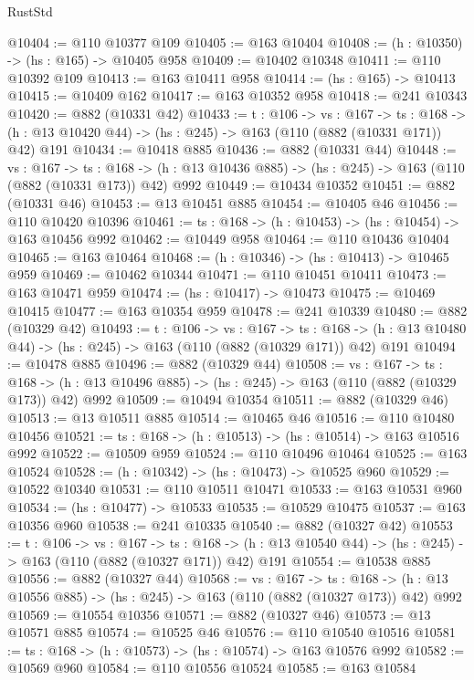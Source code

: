 \begin{lexlean}{RustStd}
\begin{coremodule}
@10404 := @110 @10377 @109
@10405 := @163 @10404
@10408 := (h : @10350) -> (hs : @165) -> @10405 @958
@10409 := @10402 @10348
@10411 := @110 @10392 @109
@10413 := @163 @10411 @958
@10414 := (hs : @165) -> @10413
@10415 := @10409 @162
@10417 := @163 @10352 @958
@10418 := @241 @10343
@10420 := @882 (@10331 @42)
@10433 := {t : @106} ->
  {vs : @167} ->
  {ts : @168} -> (h : @13 @10420 @44) -> (hs : @245) -> @163 (@110 (@882 (@10331 @171)) @42) @191
@10434 := @10418 @885
@10436 := @882 (@10331 @44)
@10448 := {vs : @167} ->
  {ts : @168} -> (h : @13 @10436 @885) -> (hs : @245) -> @163 (@110 (@882 (@10331 @173)) @42) @992
@10449 := @10434 @10352
@10451 := @882 (@10331 @46)
@10453 := @13 @10451 @885
@10454 := @10405 @46
@10456 := @110 @10420 @10396
@10461 := {ts : @168} -> (h : @10453) -> (hs : @10454) -> @163 @10456 @992
@10462 := @10449 @958
@10464 := @110 @10436 @10404
@10465 := @163 @10464
@10468 := (h : @10346) -> (hs : @10413) -> @10465 @959
@10469 := @10462 @10344
@10471 := @110 @10451 @10411
@10473 := @163 @10471 @959
@10474 := (hs : @10417) -> @10473
@10475 := @10469 @10415
@10477 := @163 @10354 @959
@10478 := @241 @10339
@10480 := @882 (@10329 @42)
@10493 := {t : @106} ->
  {vs : @167} ->
  {ts : @168} -> (h : @13 @10480 @44) -> (hs : @245) -> @163 (@110 (@882 (@10329 @171)) @42) @191
@10494 := @10478 @885
@10496 := @882 (@10329 @44)
@10508 := {vs : @167} ->
  {ts : @168} -> (h : @13 @10496 @885) -> (hs : @245) -> @163 (@110 (@882 (@10329 @173)) @42) @992
@10509 := @10494 @10354
@10511 := @882 (@10329 @46)
@10513 := @13 @10511 @885
@10514 := @10465 @46
@10516 := @110 @10480 @10456
@10521 := {ts : @168} -> (h : @10513) -> (hs : @10514) -> @163 @10516 @992
@10522 := @10509 @959
@10524 := @110 @10496 @10464
@10525 := @163 @10524
@10528 := (h : @10342) -> (hs : @10473) -> @10525 @960
@10529 := @10522 @10340
@10531 := @110 @10511 @10471
@10533 := @163 @10531 @960
@10534 := (hs : @10477) -> @10533
@10535 := @10529 @10475
@10537 := @163 @10356 @960
@10538 := @241 @10335
@10540 := @882 (@10327 @42)
@10553 := {t : @106} ->
  {vs : @167} ->
  {ts : @168} -> (h : @13 @10540 @44) -> (hs : @245) -> @163 (@110 (@882 (@10327 @171)) @42) @191
@10554 := @10538 @885
@10556 := @882 (@10327 @44)
@10568 := {vs : @167} ->
  {ts : @168} -> (h : @13 @10556 @885) -> (hs : @245) -> @163 (@110 (@882 (@10327 @173)) @42) @992
@10569 := @10554 @10356
@10571 := @882 (@10327 @46)
@10573 := @13 @10571 @885
@10574 := @10525 @46
@10576 := @110 @10540 @10516
@10581 := {ts : @168} -> (h : @10573) -> (hs : @10574) -> @163 @10576 @992
@10582 := @10569 @960
@10584 := @110 @10556 @10524
@10585 := @163 @10584

\end{coremodule}
\end{lexlean}
